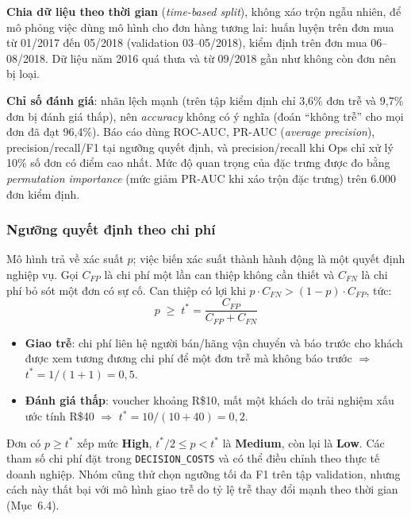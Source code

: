 \textbf{Chia dữ liệu theo thời gian} (\textit{time-based split}), không xáo trộn ngẫu nhiên,
để mô phỏng việc dùng mô hình cho đơn hàng tương lai: huấn luyện trên đơn mua từ 01/2017 đến
05/2018 (validation 03--05/2018), kiểm định trên đơn mua 06--08/2018. Dữ liệu năm 2016 quá
thưa và từ 09/2018 gần như không còn đơn nên bị loại.

\textbf{Chỉ số đánh giá}: nhãn lệch mạnh (trên tập kiểm định chỉ 3,6\% đơn trễ và 9,7\% đơn bị
đánh giá thấp), nên \textit{accuracy} không có ý nghĩa (đoán ``không trễ'' cho mọi đơn đã đạt
96,4\%). Báo cáo dùng ROC-AUC, PR-AUC (\textit{average precision}), precision/recall/F1 tại
ngưỡng quyết định, và precision/recall khi Ops chỉ xử lý 10\% số đơn có điểm cao nhất.
Mức độ quan trọng của đặc trưng được đo bằng \textit{permutation importance} (mức giảm PR-AUC
khi xáo trộn đặc trưng) trên 6.000 đơn kiểm định.

\subsubsection{Ngưỡng quyết định theo chi phí}
\hspace{1cm}
Mô hình trả về xác suất $p$; việc biến xác suất thành hành động là một quyết định nghiệp vụ.
Gọi $C_{FP}$ là chi phí một lần can thiệp không cần thiết và $C_{FN}$ là chi phí bỏ sót một
đơn có sự cố. Can thiệp có lợi khi $p \cdot C_{FN} > (1-p) \cdot C_{FP}$, tức:
\[
    p \;\geq\; t^{*} = \frac{C_{FP}}{C_{FP} + C_{FN}}
\]
\begin{itemize}
    \item \textbf{Giao trễ}: chi phí liên hệ người bán/hãng vận chuyển và báo trước cho khách
          được xem tương đương chi phí để một đơn trễ mà không báo trước $\Rightarrow$
          $t^{*} = 1/(1+1) = 0{,}5$.
    \item \textbf{Đánh giá thấp}: voucher khoảng R\$10, mất một khách do trải nghiệm xấu ước
          tính R\$40 $\Rightarrow$ $t^{*} = 10/(10+40) = 0{,}2$.
\end{itemize}
Đơn có $p \geq t^{*}$ xếp mức \textbf{High}, $t^{*}/2 \leq p < t^{*}$ là \textbf{Medium}, còn
lại là \textbf{Low}. Các tham số chi phí đặt trong \texttt{DECISION\_COSTS} và có thể điều chỉnh
theo thực tế doanh nghiệp. Nhóm cũng thử chọn ngưỡng tối đa F1 trên tập validation, nhưng cách
này thất bại với mô hình giao trễ do tỷ lệ trễ thay đổi mạnh theo thời gian (Mục~6.4).

